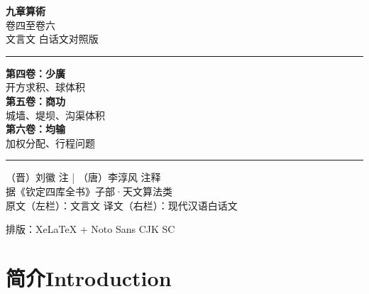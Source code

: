 \documentclass[11pt,a4paper]{article}
\newcommand{\shortline}{\noindent\rule{0.5\textwidth}{0.4pt}\par}
\newcommand{\bilingualsection}[2]{%
  \section{#1\hfill\normalfont\large\color{sectioncolor}#2}%
}
\begin{document}
\begin{titlepage}
\begin{center}
\vspace*{2cm}

{\Huge\bfseries\color{titlecolor} 九章算術}\\[0.8em]
{\LARGE\color{sectioncolor} 卷四至卷六}\\[1.5em]
{\Large\color{volcolor} 文言文 \raisebox{0.1ex}{$\leftrightarrow$} 白话文对照版}\\[2.5em]

\shortline

\vspace{1.5cm}

{\large\bfseries 第四卷：少廣}\\[0.3em]
{\normalsize 开方求积、球体积}\\[1em]
{\large\bfseries 第五卷：商功}\\[0.3em]
{\normalsize 城墙、堤坝、沟渠体积}\\[1em]
{\large\bfseries 第六卷：均输}\\[0.3em]
{\normalsize 加权分配、行程问题}\\[2em]

\shortline

\vspace{1.5cm}

{\normalsize （晋）刘徽 注 \quad | \quad （唐）李淳风 注释}\\[2em]

{\small 据《钦定四库全书》子部·天文算法类}\\[0.5em]
{\small 原文（左栏）：文言文 \quad 译文（右栏）：现代汉语白话文}

\vfill

{\small 排版：XeLaTeX + Noto Sans CJK SC}

\end{center}
\end{titlepage}

\tableofcontents
\newpage

\bilingualsection{简介}{Introduction}
\end{document}

